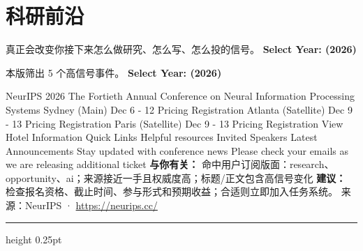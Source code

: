 \documentclass[10.5pt]{ctexart}
\begin{document}
\section*{科研前沿}
{\color{ormuted} 真正会改变你接下来怎么做研究、怎么写、怎么投的信号。}
\vspace{2mm}
{\LARGE\bfseries Select Year: (2026)}\par
\vspace{1mm}
{\color{ormuted} 本版筛出 5 个高信号事件。}
\vspace{3mm}
{\Large\bfseries Select Year: (2026)}\par
NeurIPS 2026 The Fortieth Annual Conference on Neural Information Processing Systems Sydney (Main) Dec 6 - 12 Pricing Registration Atlanta (Satellite) Dec 9 - 13 Pricing Registration Paris (Satellite) Dec 9 - 13 Pricing Registration View Hotel Information Quick Links Helpful resources Invited Speakers Latest Announcements Stay updated with conference news Please check your emails as we are releasing additional ticket
\textbf{与你有关：} 命中用户订阅版面：research、opportunity、ai；来源接近一手且权威度高；标题/正文包含高信号变化
\textbf{建议：} 检查报名资格、截止时间、参与形式和预期收益；合适则立即加入任务系统。
{\footnotesize\color{ormuted} 来源：NeurIPS · \url{https://neurips.cc/}}
\vspace{4mm}
\hrule height 0.25pt
\vspace{3mm}
\end{document}
